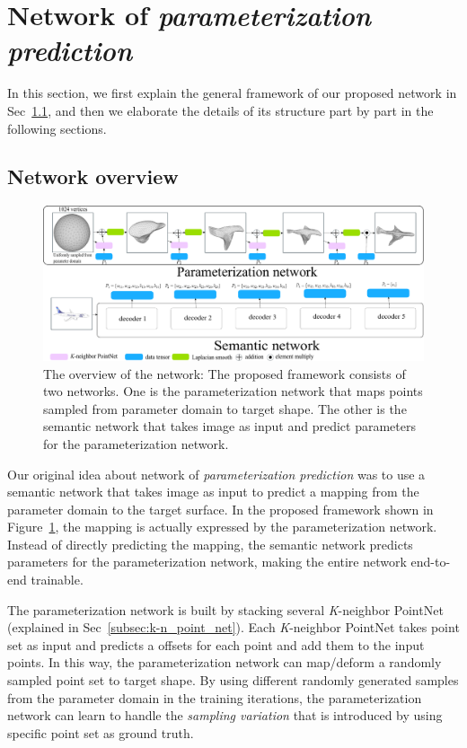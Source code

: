 \section{Network of \emph{parameterization prediction}}
In this section, we first explain the general framework of our proposed network in Sec~\ref{subsec:overview}, and then we elaborate the details of its structure part by part in the following sections.
\subsection{Network overview}
\label{subsec:overview}

\begin{figure}[htbp]
	\centering
	\includegraphics[width=\linewidth]{img/net/overview}
	\caption{The overview of the network: The proposed framework consists of two networks. One is the parameterization network that maps points sampled from parameter domain to target shape. The other is the semantic network that takes image as input and predict parameters for the parameterization network.}
	\label{fig:overview}
\end{figure}

Our original idea about network of \emph{parameterization prediction} was to use a semantic network that takes image as input to predict a mapping from the parameter domain to the target surface. In the proposed framework shown in Figure~\ref{fig:overview}, the mapping is actually expressed by the parameterization network. Instead of directly predicting the mapping, the semantic network predicts parameters for the parameterization network, making the entire network end-to-end trainable.

The parameterization network is built by stacking several \textit{K}-neighbor PointNet (explained in Sec~\ref{subsec:k-n_point_net}). Each \textit{K}-neighbor PointNet takes point set as input and predicts a offsets for each point and add them to the input points. In this way, the parameterization network can map/deform a randomly sampled point set to target shape. By using different randomly generated samples from the parameter domain in the training iterations, the parameterization network can learn to handle the \textit{sampling variation} that is introduced by using specific point set as ground truth. 

